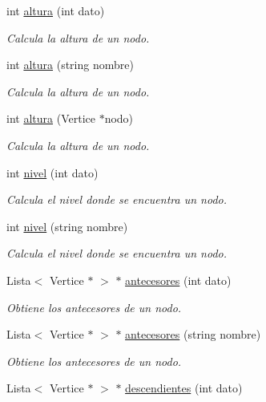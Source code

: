 \begin{DoxyCompactItemize}
int \hyperlink{classArbol_a98151655f0dab81b40d34f87fbbd90cd}{altura} (int dato)
\begin{DoxyCompactList}\small\item\em Calcula la altura de un nodo. \end{DoxyCompactList}\item 
int \hyperlink{classArbol_a7a79cb43ca30b5120f1a8ebe3afbe22c}{altura} (string nombre)
\begin{DoxyCompactList}\small\item\em Calcula la altura de un nodo. \end{DoxyCompactList}\item 
int \hyperlink{classArbol_a9f8928b4c72e2d484ef75cf3633c22ce}{altura} (Vertice $\ast$nodo)
\begin{DoxyCompactList}\small\item\em Calcula la altura de un nodo. \end{DoxyCompactList}\item 
int \hyperlink{classArbol_accd2dd2f8012067c1a2d77fd14c64546}{nivel} (int dato)
\begin{DoxyCompactList}\small\item\em Calcula el nivel donde se encuentra un nodo. \end{DoxyCompactList}\item 
int \hyperlink{classArbol_a3a8a414e8e3f45bf90c481649928a86d}{nivel} (string nombre)
\begin{DoxyCompactList}\small\item\em Calcula el nivel donde se encuentra un nodo. \end{DoxyCompactList}\item 
Lista$<$ Vertice $\ast$ $>$ $\ast$ \hyperlink{classArbol_ac7ff5e2f436a1e83e24cbdd0b2cc827b}{antecesores} (int dato)
\begin{DoxyCompactList}\small\item\em Obtiene los antecesores de un nodo. \end{DoxyCompactList}\item 
Lista$<$ Vertice $\ast$ $>$ $\ast$ \hyperlink{classArbol_aa975d5d9cf5fcfc392a8200bd0078d1c}{antecesores} (string nombre)
\begin{DoxyCompactList}\small\item\em Obtiene los antecesores de un nodo. \end{DoxyCompactList}\item 
Lista$<$ Vertice $\ast$ $>$ $\ast$ \hyperlink{classArbol_acae8e9dfd17ae18e250d9029172e1c9e}{descendientes} (int dato)

\end{DoxyCompactItemize}
